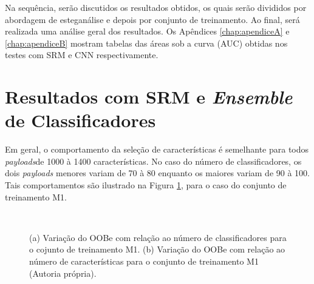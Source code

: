 Na sequência, serão discutidos os resultados obtidos, os quais serão divididos por abordagem de esteganálise e depois por conjunto de treinamento. Ao final, será realizada uma análise geral dos resultados. Os Apêndices \ref{chap:apendiceA} e \ref{chap:apendiceB} mostram tabelas das áreas sob a curva (AUC) obtidas nos testes com SRM e CNN respectivamente.

\clearpage
\section{Resultados com SRM e \textit{Ensemble} de Classificadores}

Em geral, o comportamento da seleção de características é semelhante para todos \textit{payloads}de 1000 à 1400 características. No caso do número de classificadores, os dois \textit{payloads} menores variam de 70 à 80 enquanto os maiores variam de 90 à 100. Tais comportamentos são ilustrado na Figura \ref{fig:srm_train}, para o caso do conjunto de treinamento M1.

\begin{figure}[ht]
\centering
	\qquad
	\\ 

\caption{(a) Variação do OOBe com relação ao número de classificadores para o cojunto de treinamento M1. (b) Variação do OOBe com relação ao número de características para o conjunto de treinamento M1 (Autoria própria).}
\label{fig:srm_train}
\end{figure}

